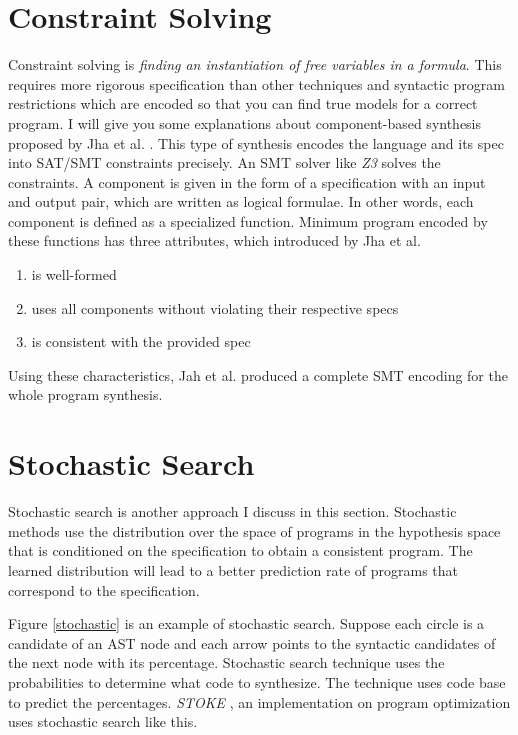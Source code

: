 \documentclass[12pt, a4paper, titlepage]{report}
\begin{document}
  \section{Constraint Solving}
    Constraint solving is \textit{finding an instantiation of free variables in a formula}. This requires more rigorous specification than other techniques and syntactic program restrictions which are encoded so that you can find true models for a correct program.
    I will give you some explanations about component-based synthesis proposed by Jha et al. \cite{jha:2010}.
    This type of synthesis encodes the language and its spec into SAT/SMT constraints precisely.
    An SMT solver like \textit{Z3} \cite{moura:2008} solves the constraints.
    A component is given in the form of a specification with an input and output pair, which are written as logical formulae.
    In other words, each component is defined as a specialized function.
    Minimum program encoded by these functions has three attributes, which introduced by Jha et al.
    \begin{enumerate}
        \item is well-formed
        \item uses all components without violating their respective specs
        \item is consistent with the provided spec
    \end{enumerate}
    Using these characteristics, Jah et al. produced a complete SMT encoding for the whole program synthesis.

  \section{Stochastic Search}
    Stochastic search is another approach I discuss in this section.
    Stochastic methods use the distribution over the space of programs in the hypothesis space that is conditioned on the specification to obtain a consistent program.
    The learned distribution will lead to a better prediction rate of programs that correspond to the specification.

    Figure \ref{stochastic} is an example of stochastic search.
    Suppose each circle is a candidate of an AST node and each arrow points to the syntactic candidates of the next node with its percentage.
    Stochastic search technique uses the probabilities to determine what code to synthesize.
    The technique uses code base to predict the percentages.
    \textit{STOKE} \cite{Schkufza:2016}, an implementation on program optimization uses stochastic search like this.
\end{document}
